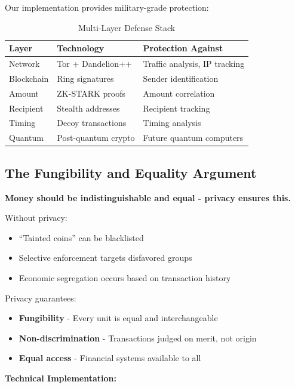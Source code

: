 \documentclass[12pt,a4paper]{article}
\begin{document}
Our implementation provides military-grade protection:

\begin{table}[h]
\centering
\begin{tabular}{lll}
\toprule
\textbf{Layer} & \textbf{Technology} & \textbf{Protection Against} \\
\midrule
Network & Tor + Dandelion++ & Traffic analysis, IP tracking \\
Blockchain & Ring signatures & Sender identification \\
Amount & ZK-STARK proofs & Amount correlation \\
Recipient & Stealth addresses & Recipient tracking \\
Timing & Decoy transactions & Timing analysis \\
Quantum & Post-quantum crypto & Future quantum computers \\
\bottomrule
\end{tabular}
\caption{Multi-Layer Defense Stack}
\end{table}

\subsection{The Fungibility and Equality Argument}

\textbf{Money should be indistinguishable and equal - privacy ensures this.}

Without privacy:
\begin{itemize}
\item ``Tainted coins'' can be blacklisted
\item Selective enforcement targets disfavored groups
\item Economic segregation occurs based on transaction history
\end{itemize}

Privacy guarantees:
\begin{itemize}
\item \textbf{Fungibility} - Every unit is equal and interchangeable
\item \textbf{Non-discrimination} - Transactions judged on merit, not origin
\item \textbf{Equal access} - Financial systems available to all
\end{itemize}

\textbf{Technical Implementation:}
\end{document}

